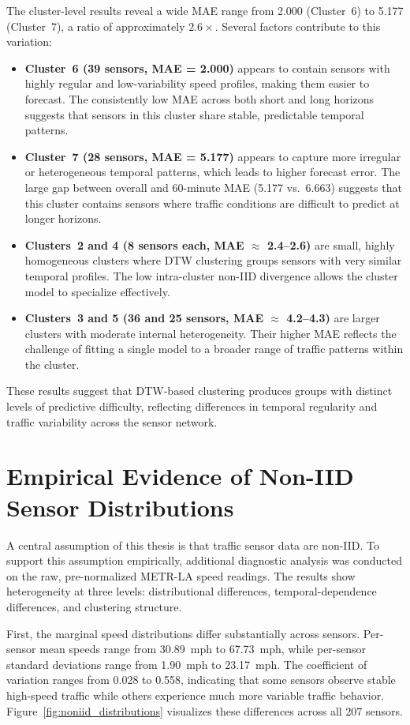 The cluster-level results reveal a wide MAE range from 2.000 (Cluster~6) to 5.177 (Cluster~7), a ratio of approximately $2.6\times$. Several factors contribute to this variation:
\begin{itemize}
    \item \textbf{Cluster~6 (39 sensors, MAE = 2.000)} appears to contain sensors with highly regular and low-variability speed profiles, making them easier to forecast. The consistently low MAE across both short and long horizons suggests that sensors in this cluster share stable, predictable temporal patterns.
    \item \textbf{Cluster~7 (28 sensors, MAE = 5.177)} appears to capture more irregular or heterogeneous temporal patterns, which leads to higher forecast error. The large gap between overall and 60-minute MAE (5.177 vs.\ 6.663) suggests that this cluster contains sensors where traffic conditions are difficult to predict at longer horizons.
    \item \textbf{Clusters~2 and 4 (8 sensors each, MAE $\approx$ 2.4--2.6)} are small, highly homogeneous clusters where DTW clustering groups sensors with very similar temporal profiles. The low intra-cluster non-IID divergence allows the cluster model to specialize effectively.
    \item \textbf{Clusters~3 and 5 (36 and 25 sensors, MAE $\approx$ 4.2--4.3)} are larger clusters with moderate internal heterogeneity. Their higher MAE reflects the challenge of fitting a single model to a broader range of traffic patterns within the cluster.
\end{itemize}
These results suggest that DTW-based clustering produces groups with distinct levels of predictive difficulty, reflecting differences in temporal regularity and traffic variability across the sensor network.

\section{Empirical Evidence of Non-IID Sensor Distributions}
\label{sec:noniid_evidence}

A central assumption of this thesis is that traffic sensor data are non-IID. To support this assumption empirically, additional diagnostic analysis was conducted on the raw, pre-normalized METR-LA speed readings. The results show heterogeneity at three levels: distributional differences, temporal-dependence differences, and clustering structure.

First, the marginal speed distributions differ substantially across sensors. Per-sensor mean speeds range from 30.89~mph to 67.73~mph, while per-sensor standard deviations range from 1.90~mph to 23.17~mph. The coefficient of variation ranges from 0.028 to 0.558, indicating that some sensors observe stable high-speed traffic while others experience much more variable traffic behavior. Figure~\ref{fig:noniid_distributions} visualizes these differences across all 207 sensors.

